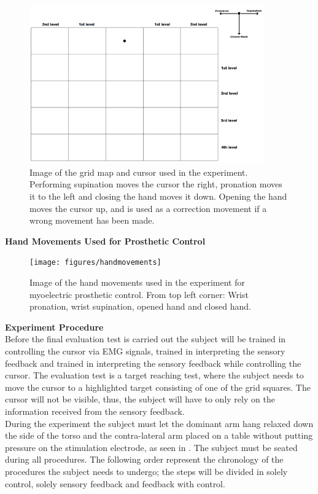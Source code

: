 \begin{figure}[H]                 
	\includegraphics[width=0.9\textwidth]{figures/gridmap2}  
	\caption{Image of the grid map and cursor used in the experiment. Performing supination moves the cursor the right, pronation moves it to the left and closing the hand moves it down. Opening the hand moves the cursor up, and is used as a correction movement if a wrong movement has been made.}
	\label{fig:gridmap} 
\end{figure}


\textbf{{\Large Hand Movements Used for Prosthetic Control}} \\

\begin{figure}[H]                 
	\texttt{[image: figures/handmovements]}
	\caption{Image of the hand movements used in the experiment for myoelectric prosthetic control. From top left corner: Wrist pronation, wrist supination, opened hand and closed hand.}
	\label{fig:handmovements} 
\end{figure}

\textbf{{\Large Experiment Procedure}} \\
\newline
Before the final evaluation test is carried out the subject will be trained in controlling the cursor via EMG signals, trained in interpreting the sensory feedback and trained in interpreting the sensory feedback while controlling the cursor. The evaluation test is a target reaching test, where the subject needs to move the cursor to a highlighted target consisting of one of the grid squares. The cursor will not be visible, thus, the subject will have to only rely on the information received from the sensory feedback. \\
During the experiment the subject must let the dominant arm hang relaxed down the side of the torso and the contra-lateral arm placed on a table without putting pressure on the stimulation electrode, as seen in . The subject must be seated during all procedures. The following order represent the chronology of the procedures the subject needs to undergo; the steps will be divided in solely control, solely sensory feedback and feedback with control. 


